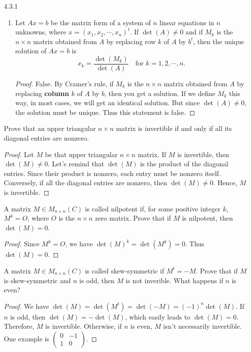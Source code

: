 \documentclass[12pt, a4paper]{article}
\theoremstyle{plain}
\begin{document}
\begin{exercise}{4.3.1}
\begin{enumerate}[label=(\roman*)]
	\item Let $Ax=b$ be the matrix form of a system of $n$ linear equations in $n$ unknowns, where $x=(x_1,x_2,\cdots ,x_n)^t$. If $\det(A)\neq 0$ and if $M_k$ is the $n\times n$ matrix obtained from $A$ by replacing row $k$ of $A$ by $b^t$, then the unique solution of $Ax=b$ is 
	\[
	x_k=\frac{\det(M_k)}{\det(A)}\quad \text{for $k=1,2,\cdots ,n.$}
	\]
	\begin{proof}
	False. By Cramer's rule, if $M_k$ is the $n\times n$ matrix obtained from $A$ by replacing \textbf{column} $k$ of $A$ by $b$, then you get a solution. If we define $M_k$ this way, in most cases, we will get an identical solution. But since $\det(A)\neq 0$, the solution must be unique. Thus this statement is false.
	\end{proof}
	\end{enumerate}
\end{exercise}

\begin{exercise}{9}
Prove that an upper triangular $n\times n$ matrix is invertible if and only if all its diagonal entries are nonzero.
\end{exercise}
	\begin{proof}
	Let $M$ be that upper triangular $n\times n$ matrix. If $M$ is invertible, then $\det(M)\neq 0$. Let's remind that $\det(M)$ is the product of the diagonal entries. Since their product is nonzero, each entry must be nonzero itself. Conversely, if all the diagonal entries are nonzero, then $\det(M)\neq 0$. Hence, $M$ is invertible.
	\end{proof}
	
\begin{exercise}{10}
A matrix $M\in M_{n\times n}(C)$ is called nilpotent if, for some positive integer $k$, $M^k=O$, where $O$ is the $n\times n$ zero matrix. Prove that if $M$ is nilpotent, then $\det(M)=0$. 
\end{exercise}
	\begin{proof}
	Since $M^k=O$, we have $\det(M)^k=\det(M^k)=0$. Thus $\det(M)=0$.
	\end{proof}
	
\begin{exercise}{11}
A matrix $M\in M_{n\times n}(C)$ is called skew-symmetric if $M^t=-M$. Prove that if $M$ is skew-symmetric and $n$ is odd, then $M$ is not inverible. What happens if $n$ is even? 
\end{exercise}
	\begin{proof}
	We have $\det(M)=\det(M^t)=\det(-M)=(-1)^n\det(M)$. If $n$ is odd, then $\det(M)=-\det(M)$, which easily leads to $\det(M)=0$. Therefore, $M$ is invertible. Otherwise, if $n$ is even, $M$ isn't necessarily invertible. One example is 
	$\begin{pmatrix}
	0&-1\\
	1&0
	\end{pmatrix}$.
	\end{proof}
	
\end{document}
